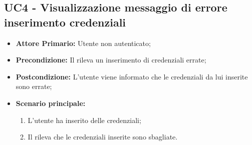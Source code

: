 \subsection{UC4 - Visualizzazione messaggio di errore inserimento credenziali}
\label{UC4}
\begin{itemize}
\item \textbf{Attore Primario:} Utente non autenticato;
\item \textbf{Precondizione:} Il  rileva un inserimento di credenziali errate;
\item \textbf{Postcondizione:} L'utente viene informato che le credenziali da lui inserite sono errate;
\item \textbf{Scenario principale:}
    \begin{enumerate}
    \item L'utente ha inserito delle credenziali;
    \item Il  rileva che le credenziali inserite sono sbagliate.
    \end{enumerate}
\end{itemize}